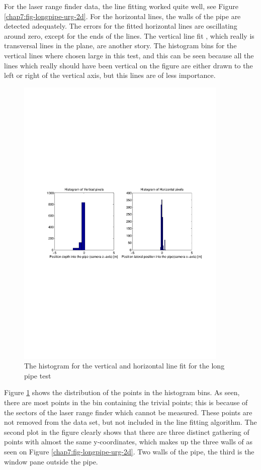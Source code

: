 For the laser range finder data, the line fitting worked quite well, see
Figure \ref{chap7:fig-longpipe-urg-2d}. For the horizontal lines, the walls of the pipe
are detected adequately. The errors for the fitted horizontal lines are oscillating
around zero, except for the ends of the lines. The vertical line fit , which
really is transversal lines in the plane, are another story. The histogram bins for the
vertical lines where chosen large in this test, and this can be seen because all the lines
which really should have been vertical on the figure are either drawn to the left or right
of the vertical axis, but this lines are of less importance. 


\begin{figure}[htbp]
    \centering
    \includegraphics[width=0.9\textwidth]{pics/longpipe-urg-hist}
    \caption{The histogram for the vertical and horizontal line fit for the long pipe test}
    \label{chap8:fig-longpipe-urg-hist}
\end{figure}
Figure \ref{chap8:fig-longpipe-urg-hist} shows the distribution of the points in the
histogram bins. As seen, there are most points in the bin containing the trivial points; this is
because of the sectors of the laser range finder which cannot be measured. These points are
not removed from the data set, but not included in the line fitting algorithm. 
The second plot in the figure clearly shows that there are three distinct gathering of
points with almost the same y-coordinates, which makes up the three walls of as seen on
Figure \ref{chap7:fig-longpipe-urg-2d}. Two walls of the pipe, the third is the window
pane outside the pipe. 

